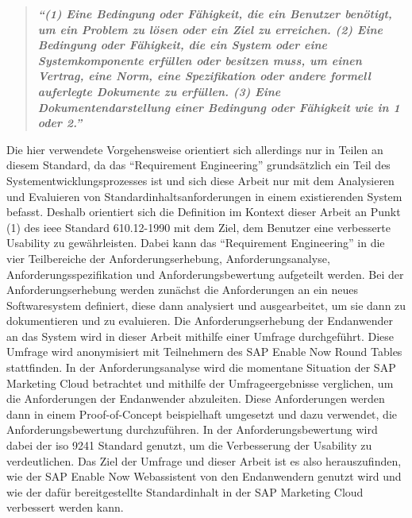 \begin{quote}
\textbf{\textit{\enquote{(1) Eine Bedingung oder Fähigkeit, die ein Benutzer benötigt, um ein Problem zu lösen oder ein Ziel zu erreichen. (2) Eine Bedingung oder Fähigkeit, die ein System oder eine Systemkomponente erfüllen oder besitzen muss, um einen Vertrag, eine Norm, eine Spezifikation oder andere formell auferlegte Dokumente zu erfüllen. (3) Eine Dokumentendarstellung einer Bedingung oder Fähigkeit wie in 1 oder 2.}}} \parencite[][S.62]{IEEE.1990}
\end{quote}  %

Die hier verwendete Vorgehensweise orientiert sich allerdings nur in Teilen an diesem Standard, da das \enquote{Requirement Engineering} grundsätzlich ein Teil des Systementwicklungsprozesses ist und sich diese Arbeit nur mit dem Analysieren und Evaluieren von Standardinhaltsanforderungen in einem existierenden System befasst. Deshalb orientiert sich die Definition im Kontext dieser Arbeit an Punkt (1) des \ac{ieee} Standard 610.12-1990 mit dem Ziel, dem Benutzer eine verbesserte Usability zu gewährleisten. Dabei kann das \enquote{Requirement Engineering} in die vier Teilbereiche der Anforderungserhebung, Anforderungsanalyse, Anforderungsspezifikation und Anforderungsbewertung aufgeteilt werden. Bei der Anforderungserhebung werden zunächst die Anforderungen an ein neues Softwaresystem definiert, diese dann analysiert und ausgearbeitet, um sie dann zu dokumentieren und zu evaluieren. \parencite[Vgl.][S.82-111]{Sommerville.2011} Die Anforderungserhebung der Endanwender an das System wird in dieser Arbeit mithilfe einer Umfrage durchgeführt.  Diese Umfrage wird anonymisiert mit Teilnehmern des SAP Enable Now Round Tables stattfinden. In der Anforderungsanalyse wird die momentane Situation der SAP Marketing Cloud betrachtet und mithilfe der Umfrageergebnisse verglichen, um die Anforderungen der Endanwender abzuleiten. Diese Anforderungen werden dann in einem Proof-of-Concept beispielhaft umgesetzt und dazu verwendet, die Anforderungsbewertung durchzuführen. In der Anforderungsbewertung wird dabei der \ac{iso} 9241 Standard\parencite[][]{ISOOrg.2019}  genutzt, um die Verbesserung der Usability zu verdeutlichen. Das Ziel der Umfrage und dieser Arbeit ist es also herauszufinden, wie der SAP Enable Now Webassistent von den Endanwendern genutzt wird und wie der dafür bereitgestellte Standardinhalt in der SAP Marketing Cloud verbessert werden kann.
